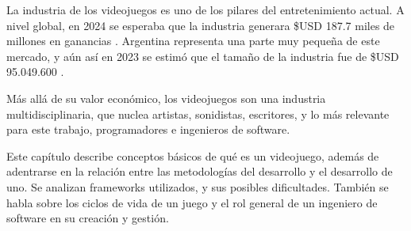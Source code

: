 \par La industria de los videojuegos es uno de los pilares del entretenimiento actual. A nivel global, en 2024 se esperaba que la industria generara \$USD 187.7 miles de millones en ganancias \cite{buijsmanGlobalGamesMarket2024}. Argentina representa una parte muy pequeña de este mercado, y aún así en 2023 se estimó que el tamaño de la industria fue de \$USD 95.049.600 \cite{delaiglesiaObservatorioIndustriaArgentina2024}.
\bigbreak
\par Más allá de su valor económico, los videojuegos son una industria multidisciplinaria, que nuclea artistas, sonidistas, escritores, y lo más relevante para este trabajo, programadores e ingenieros de software.
\bigbreak
\par Este capítulo describe conceptos básicos de qué es un videojuego, además de adentrarse en la relación entre las metodologías del desarrollo y el desarrollo de uno. Se analizan frameworks utilizados, y sus posibles dificultades. También se habla sobre los ciclos de vida de un juego y el rol general de un ingeniero de software en su creación y gestión.
%
%
